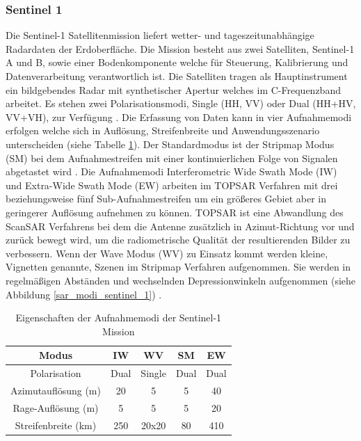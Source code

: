 \subsubsection{Sentinel 1}
Die Sentinel-1 Satellitenmission liefert wetter- und tageszeitunabhängige Radardaten der Erdoberfläche. Die Mission besteht aus zwei Satelliten, Sentinel-1 A und B,
sowie einer Bodenkomponente welche für Steuerung, Kalibrierung und Datenverarbeitung verantwortlich ist. Die Satelliten tragen als Hauptinstrument ein 
bildgebendes Radar mit synthetischer Apertur welches im C-Frequenzband arbeitet. Es stehen zwei Polarisationsmodi, Single (HH, VV) oder Dual (HH+HV, VV+VH),
zur Verfügung \cite{sentinel_1_definition}. 
Die Erfassung von Daten kann in vier Aufnahmemodi erfolgen welche sich in Auflösung, Streifenbreite und Anwendungsszenario unterscheiden (siehe Tabelle \ref{aufnahmemodi_sentinel_1}). 
Der Standardmodus ist der Stripmap Modus (SM) bei dem Aufnahmestreifen mit einer kontinuierlichen Folge von Signalen abgetastet wird \cite{sentinel_1_definition}.
Die Aufnahmemodi Interferometric Wide Swath Mode (IW) und Extra-Wide Swath Mode (EW) arbeiten im TOPSAR Verfahren mit drei beziehungsweise
fünf Sub-Aufnahmestreifen um ein größeres Gebiet aber in geringerer Auflösung aufnehmen zu können. TOPSAR ist eine Abwandlung des ScanSAR Verfahrens bei 
dem die Antenne zusätzlich in Azimut-Richtung vor und zurück bewegt wird, um die radiometrische Qualität der resultierenden Bilder zu verbessern. 
Wenn der Wave Modus (WV) zu Einsatz kommt werden kleine, Vignetten genannte, Szenen im Stripmap Verfahren aufgenommen. Sie werden in regelmäßigen Abständen und
wechselnden Depressionwinkeln aufgenommen (siehe Abbildung \ref{sar_modi_sentinel_1}) \cite{tutorial_on_sar}\cite{sentinel_1_definition}.   


\begin{center}
\begin{table}[H]
    \caption{Eigenschaften der Aufnahmemodi der Sentinel-1 Mission \cite{sentinel_1_overview}}
    \centering
    \begin{tabular}{c|c c c c } 
        Modus & IW & WV & SM & EW \\ 
        \hline
        Polarisation & Dual & Single & Dual & Dual \\ 
        Azimutauflösung (m) & 20 & 5 & 5 & 40 \\
        Rage-Auflösung (m) & 5 & 5 & 5 & 20 \\
        Streifenbreite (km) & 250 & 20x20 & 80 & 410\\
    \end{tabular}
    \label{aufnahmemodi_sentinel_1}
\end{table}
\end{center}

